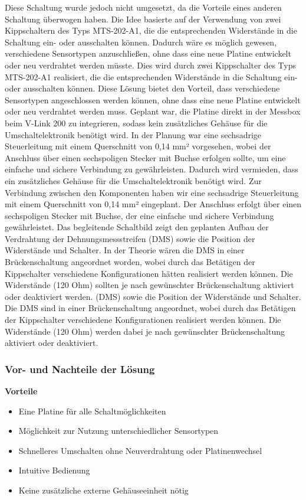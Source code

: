 Diese Schaltung wurde jedoch nicht umgesetzt, da die Vorteile eines anderen Schaltung überwogen haben.
Die Idee basierte auf der Verwendung von zwei Kippschaltern des Typs MTS-202-A1, die die entsprechenden Widerstände in die Schaltung ein- oder ausschalten können.
Dadurch wäre es möglich gewesen, verschiedene Sensortypen anzuschließen, ohne dass eine neue Platine entwickelt oder neu verdrahtet werden müsste. 
Dies wird durch zwei Kippschalter des Typs MTS-202-A1 realisiert, die die entsprechenden Widerstände in die Schaltung ein- oder ausschalten können.
Diese Lösung bietet den Vorteil, dass verschiedene Sensortypen angeschlossen werden können, ohne dass eine neue Platine entwickelt oder neu verdrahtet werden muss.
Geplant war, die Platine direkt in der Messbox beim V-Link 200 zu integrieren, sodass kein zusätzliches Gehäuse für die Umschaltelektronik benötigt wird.
In der Planung war eine sechsadrige Steuerleitung mit einem Querschnitt von 0,14 mm² vorgesehen, wobei der Anschluss über einen sechspoligen Stecker mit Buchse erfolgen sollte,
um eine einfache und sichere Verbindung zu gewährleisten.
Dadurch wird vermieden, dass ein zusätzliches Gehäuse für die Umschaltelektronik benötigt wird.
Zur Verbindung zwischen den Komponenten haben wir eine sechsadrige Steuerleitung mit einem Querschnitt von 0,14 mm² eingeplant.
Der Anschluss erfolgt über einen sechspoligen Stecker mit Buchse, der eine einfache und sichere Verbindung gewährleistet.
Das begleitende Schaltbild zeigt den geplanten Aufbau der Verdrahtung der Dehnungsmessstreifen (DMS) sowie die Position der Widerstände und Schalter.
In der Theorie wären die DMS in einer Brückenschaltung angeordnet worden, wobei durch das Betätigen der Kippschalter verschiedene Konfigurationen hätten realisiert werden können.
Die Widerstände (120 Ohm) sollten je nach gewünschter Brückenschaltung aktiviert oder deaktiviert werden. (DMS) sowie die Position der Widerstände und Schalter.
Die DMS sind in einer Brückenschaltung angeordnet, wobei durch das Betätigen der Kippschalter verschiedene Konfigurationen realisiert werden können.
Die Widerstände (120 Ohm) werden dabei je nach gewünschter Brückenschaltung aktiviert oder deaktiviert.
\subsubsection{Vor- und Nachteile der Lösung}
\textbf{Vorteile}
\begin{itemize}
    \item Eine Platine für alle Schaltmöglichkeiten
    \item Möglichkeit zur Nutzung unterschiedlicher Sensortypen
    \item Schnelleres Umschalten ohne Neuverdrahtung oder Platinenwechsel
    \item Intuitive Bedienung
    \item Keine zusätzliche externe Gehäuseeinheit nötig
\end{itemize}

